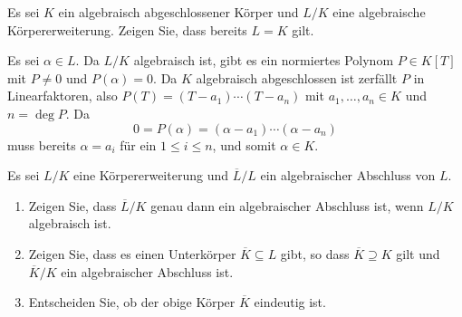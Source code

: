\begin{question}
  \label{question: algebraically closed fields have no nontrivial algebraic extensions}
  Es sei $K$ ein algebraisch abgeschlossener Körper und $L/K$ eine algebraische Körpererweiterung.
  Zeigen Sie, dass bereits $L = K$ gilt.
\end{question}


\begin{solution}
  Es sei $\alpha \in L$.
  Da $L/K$ algebraisch ist, gibt es ein normiertes Polynom $P \in K[T]$ mit $P \neq 0$ und $P(\alpha) = 0$.
  Da $K$ algebraisch abgeschlossen ist zerfällt $P$ in Linearfaktoren, also $P(T) = (T - a_1) \dotsm (T - a_n)$ mit $a_1, \dotsc, a_n \in K$ und $n = \deg P$.
  Da
  \[
      0
    = P(\alpha)
    = (\alpha - a_1) \dotsm (\alpha - a_n)
  \]
  muss bereits $\alpha = a_i$ für ein $1 \leq i \leq n$, und somit $\alpha \in K$.
\end{solution}


\begin{question}
  \label{question: transitivity of algebraic closure}
  Es sei $L/K$ eine Körpererweiterung und $\overline{L}/L$ ein algebraischer Abschluss von $L$.
  \begin{enumerate}
    \item
      Zeigen Sie, dass $\overline{L}/K$ genau dann ein algebraischer Abschluss ist, wenn $L/K$ algebraisch ist.
    \item
      Zeigen Sie, dass es einen Unterkörper $\overline{K} \subseteq L$ gibt, so dass $\overline{K} \supseteq K$ gilt und $\overline{K}/K$ ein algebraischer Abschluss ist.
    \item
      Entscheiden Sie, ob der obige Körper $\overline{K}$ eindeutig ist.
  \end{enumerate}
\end{question}


